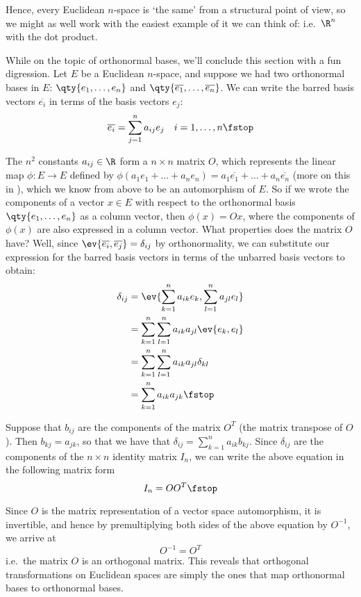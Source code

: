 Hence, every Euclidean \( n \)-space is `the same' from a structural point of view, so we might as well work with the easiest example of it we can think of: i.e.\ \( \R^n \) with the dot product.

\vspace{3mm}

While on the topic of orthonormal bases, we'll conclude this section with a fun digression. Let \( E \) be a Euclidean \( n \)-space, and suppose we had two orthonormal bases in \( E \): \( \qty{e_1,\dots,e_n} \) and \( \qty{\overline{e_1},\dots,\overline{e_n}} \). We can write the barred basis vectors \( \overline{e_i} \) in terms of the basis vectors \( e_j \):
\[ \overline{e_i}=\sum_{j=1}^na_{ij}e_j \quad i=1,\dots,n\fstop \]

The \( n^2 \) constants \( a_{ij}\in\R \) form a \( n\times n \) matrix \( O \), which represents the linear map \( \phi:E\to E \) defined by \( \phi(a_1e_1+\dots+a_ne_n)=a_1\overline{e_1}+\dots+a_n\overline{e_n} \) (more on this in ), which we know from above to be an automorphism of \( E \). So if we wrote the components of a vector \( x\in E \) with respect to the orthonormal basis \( \qty{e_1,\dots,e_n} \) as a column vector, then \( \phi(x)=Ox \), where the components of \( \phi(x) \) are also expressed in a column vector. What properties does the matrix \( O \) have? Well, since \( \ev{\overline{e_i},\overline{e_j}}=\delta_{ij} \) by orthonormality, we can substitute our expression for the barred basis vectors in terms of the unbarred basis vectors to obtain:
\begin{align*}
  \delta_{ij}&= \ev{\sum_{k=1}^na_{ik}e_k,\sum_{l=1}^na_{jl}e_l}\\
  &= \sum_{k=1}^n\sum_{l=1}^na_{ik}a_{jl}\ev{e_k,e_l}\\
  &= \sum_{k=1}^n\sum_{l=1}^na_{ik}a_{jl}\delta_{kl}\\
  &= \sum_{k=1}^na_{ik}a_{jk}\fstop
\end{align*}

Suppose that \( b_{ij} \) are the components of the matrix \( O^T \) (the matrix transpose of \( O \)). Then \( b_{kj}=a_{jk} \), so that we have that \( \delta_{ij}=\sum_{k=1}^n a_{ik}b_{kj} \). Since \( \delta_{ij} \) are the components of the \( n\times n \) identity matrix \( I_n \), we can write the above equation in the following matrix form
\[ I_n=OO^T\fstop \]

Since \( O \) is the matrix representation of a vector space automorphism, it is invertible, and hence by premultiplying both sides of the above equation by \( O^{-1} \), we arrive at
\[ O^{-1}=O^T \]
i.e.\ the matrix \( O \) is an orthogonal matrix. This reveals that orthogonal transformations on Euclidean spaces are simply the ones that map orthonormal bases to orthonormal bases.


